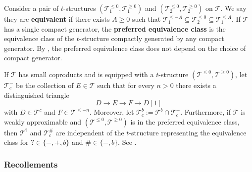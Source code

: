 \documentclass[11pt]{amsart}
\theoremstyle{plain}
\theoremstyle{definition}
\numberwithin{equation}{section}
\numberwithin{theorem}{section}
\begin{document}
Consider a pair of $t$-structures $(\mathcal{T}_1^{\leq 0},\mathcal{T}_1^{\geq 0})$ and $(\mathcal{T}_2^{\leq 0},\mathcal{T}_2^{\geq 0})$ on $\mathcal{T}$.
We say they are \textbf{equivalent} if there exists $A\geq 0$ such that $\mathcal{T}_1^{\leq -A}\subseteq \mathcal{T}_2^{\leq 0}\subseteq \mathcal{T}_1^{\leq A}$.
If $\mathcal{T}$ has a single compact generator, the \textbf{preferred equivalence class} is the equivalence class of the $t$-structure compactly generated by any compact generator.
By \cite[Remark 1.19]{Neeman:2026}, the preferred equivalence class does not depend on the choice of compact generator. 

If $\mathcal{T}$ has small coproducts and is equipped with a $t$-structure $(\mathcal{T}^{\leq 0}, \mathcal{T}^{\geq 0})$, let $\mathcal{T}^-_c$ be the collection of $E\in \mathcal{T}$ such that for every $n>0$ there exists a distinguished triangle 
\begin{displaymath}
    D \to E \to F \to D[1]
\end{displaymath}
with $D\in \mathcal{T}^c$ and $F\in \mathcal{T}^{\leq -n}$. 
Moreover, let $\mathcal{T}^b_c := \mathcal{T}^b \cap \mathcal{T}^-_c$. 
Furthermore, if $\mathcal{T}$ is weakly approximable and $(\mathcal{T}^{\leq 0}, \mathcal{T}^{\geq 0})$ is in the preferred equivalence class, then $\mathcal{T}^?$ and $\mathcal{T}^\#_c$ are independent of the $t$-structure representing the equivalence class for $?\in \{-,+,b\}$ and $\# \in \{-,b\}$. 
See \cite[Remark 4.1.5]{Canonaco/Haesemeyer/Neeman/Stellari:2024}.

\subsubsection{Recollements}
\label{sec:prelim_recollements}
\end{document}
